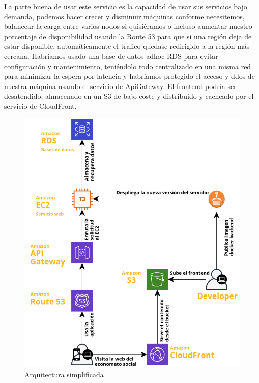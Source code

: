 \vspace{1em}
\par La parte buena de usar este servicio es la capacidad de usar sus servicios bajo demanda, podemos hacer crecer y disminuir máquinas conforme necesitemos, balancear la carga entre varios nodos si quisiéramos o incluso aumentar nuestro porcentaje de disponibilidad usando la Route 53 para que si una región deja de estar disponible, automáticamente el trafico quedase redirigido a la región más cercana. Habríamos usado una base de datos adhoc RDS para evitar configuración y mantenimiento, teniéndolo todo centralizado en una misma red para minimizar la espera por latencia y habríamos protegido el acceso y ddos de nuestra máquina usando el servicio de ApiGateway. El frontend podría ser desatendido, almacenado en un S3 de bajo coste y distribuido y cacheado por el servicio de CloudFront.
\begin{figure}[h]
\centering
\includegraphics[scale=0.5]{archivos/arquitecturaAws.png}
\caption{Arquitectura simplificada}
\end{figure}
\clearpage
